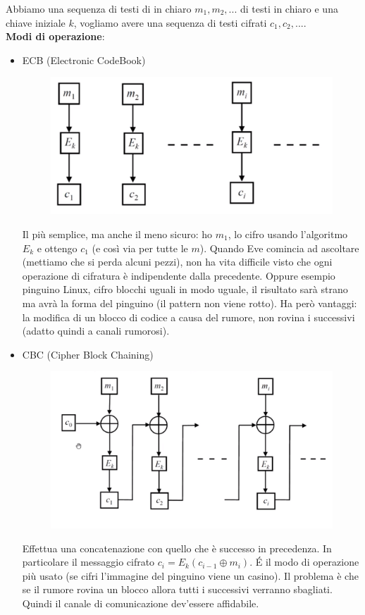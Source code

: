 \begin{itemize}
Abbiamo una sequenza di testi di in chiaro $m_1, m_2, ...$ di testi in chiaro e una chiave iniziale $k$, vogliamo avere una sequenza di testi cifrati $c_1, c_2,...$.\\
\textbf{Modi di operazione}: 
\begin{itemize}
	\item ECB (Electronic CodeBook)\\
	\begin{figure}[h]
		\centering
		\includegraphics[width=0.5\linewidth]{immagini/img38}
	\end{figure}
	Il più semplice, ma anche il meno sicuro: ho $m_1$, lo cifro usando l'algoritmo $E_k$ e ottengo $c_1$ (e così via per tutte le $m$). Quando Eve comincia ad ascoltare (mettiamo che si perda alcuni pezzi), non ha vita difficile visto che ogni operazione di cifratura è indipendente dalla precedente. Oppure esempio pinguino Linux, cifro blocchi uguali in modo uguale, il risultato sarà strano ma avrà la forma del pinguino (il pattern non viene rotto). Ha però vantaggi: la modifica di un blocco di codice a causa del rumore, non rovina i successivi (adatto quindi a canali rumorosi).
	\item CBC (Cipher Block Chaining)\\
	\begin{figure}[h]
		\centering
		\includegraphics[width=0.5\linewidth]{immagini/img37}
	\end{figure}
Effettua una concatenazione con quello che è successo in precedenza. In particolare il messaggio cifrato $c_i = E_k(c_{i-1} \oplus m_i)$.
\'E il modo di operazione più usato (se cifri l'immagine del pinguino viene un casino). Il problema è che se il rumore rovina un blocco allora tutti i successivi verranno sbagliati. Quindi il canale di comunicazione dev'essere affidabile.

\end{itemize}
\end{itemize}
